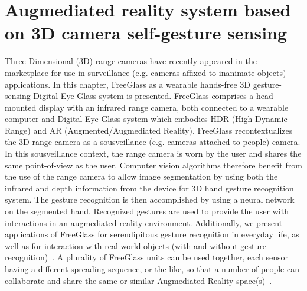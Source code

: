 \chapter{Augmediated reality system based on 3D camera self-gesture sensing}
\label{ar3dgesture}

Three Dimensional (3D) range cameras have recently appeared in the marketplace for use in surveillance
(e.g. cameras affixed to inanimate objects) applications. In this chapter, FreeGlass as a wearable hands-free 3D gesture-sensing Digital Eye Glass system is presented. FreeGlass comprises a head-mounted display with an infrared range camera, both connected to a wearable computer and Digital Eye Glass system which embodies HDR (High Dynamic Range) and AR (Augmented/Augmediated Reality). FreeGlass recontextualizes the 3D range camera as a sousveillance (e.g. cameras attached to people) camera. In this sousveillance context, the range camera is worn by the user and shares the same point-of-view as the user. Computer vision algorithms therefore benefit from the use of the range camera to allow image segmentation by using both the infrared and depth information from the device for 3D hand gesture recognition system. The gesture recognition is then accomplished by using a neural network on the segmented hand. Recognized gestures are used to provide the user with interactions in an augmediated reality environment. Additionally, we present applications of FreeGlass for serendipitous gesture recognition in everyday life, as well as for interaction with real-world objects (with and without gesture recognition)~\cite{buchmann2004fingartips,billinghurst2001collaboration,billinghurst2008tangible,kawashima2001magic}. A plurality of FreeGlass units can be used together, each sensor having a different spreading sequence, or the like, so that a number of people can collaborate and share the same or similar Augmediated Reality space(s)~\cite{billinghurst2002collaborative,billinghurst2000mixing}.

